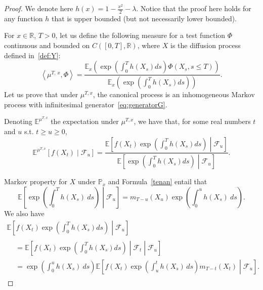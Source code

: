 \documentclass[10pt]{amsart}
\theoremstyle{definition}\newtheorem{defi}[theo]{Definition}\newtheorem{rema}[theo]{Remark}\newtheorem{exam}[theo]{Example}\newtheorem{exem}[theo]{Example}\newtheorem{nota}[theo]{Notation}
\newcommand{\Fo}{\mathcal{F}}
\renewcommand*\P{\mathbb{P}}
\newcommand*\R{\mathbb{R}}
\newcommand*\E{\mathbb{E}}
\begin{document}
\begin{proof}
We denote here $h(x)=1-\frac{x^2}{2}-\lambda$. Notice that the proof here holds for any function $h$ that is upper bounded (but not necessarily lower bounded).


For $x\in \R$, $T>0$, let us define the following measure for a test function $\Phi$ continuous and bounded on $C([0,T],\R)$, where $X$ is the diffusion process defined in~\eqref{def:Y}:
\begin{equation}
\left\langle \mu^{T,\,x},\Phi\right\rangle=\frac{\E_x\left(\exp\left(\int_0^T h(X_s)ds\right)\Phi\left(X_s,s\leq T\right)\right)}{\E_x\left(\exp\left(\int_0^T h(X_s)ds\right)\right)}.
\end{equation}
Let us prove that under $\mu^{T,x}$, the canonical process is an inhomogeneous Markov process with infinitesimal generator~\eqref{eq:generatorG}.

Denoting $\E^{\mu^{T,x}}$ the expectation under $\mu^{T,x}$, we have that, for some real numbers $t$ and $u$ s.t. $t\geq u\geq 0$,
\begin{equation}\label{eq:condEx}
\E^{\mu^{T, x}}\left[f\left(X_{t}\right)\middle| \Fo_{u} \right]=\frac{\E\left[f\left(X_{t}\right)\exp\left(\int_{0}^{T} h\left(X_{s}\right)ds \right)\middle| \Fo_{u} \right]}{\E\left[\exp\left(\int_{0}^{T} h\left(X_{s}\right)ds \right)\middle| \Fo_{u} \right]}.
\end{equation}

Markov property for $X$ under $\P_{x}$ and Formula~\eqref{tenan} entail that
\begin{equation}\label{trick}
\E\left[\exp\left(\int_{0}^{T}h(X_{s})\ ds \right)\middle| \Fo_{u}\right] = m_{T-u}(X_{u}) \exp\left(\int_{0}^{u}h(X_{s})\ ds\right).
\end{equation}
We also have
\begin{multline}\label{eq:markov}
\E\left[f\left(X_{t}\right)\exp\left(\int_{0}^{T}h\left(X_{s}\right)ds \right)\middle| \Fo_{u} \right]\\
\begin{aligned}
&= \E\left[f\left(X_{t}\right)\exp\left(\int_{0}^{T}h\left(X_{s}\right)ds \right)\middle| \Fo_{t} \middle| \Fo_{u} \right]\\
&= \exp\left(\int_{0}^{u}h(X_{s})\ ds\right)\E\left[f\left(X_{t}\right)\exp\left(\int_{u}^{t}h\left(X_{s}\right)\, ds \right)m_{T-t}\left(X_{t}\right)\middle| \Fo_{u} \right].
\end{aligned}
\end{multline}


\end{proof}
\end{document}
